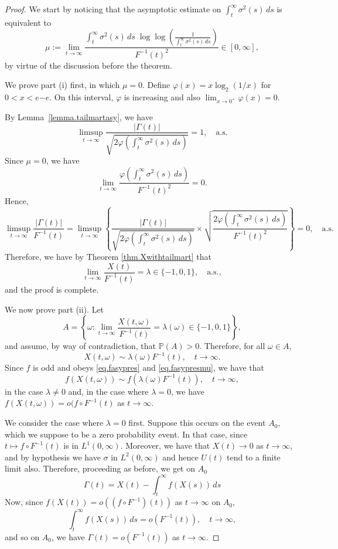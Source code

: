 \documentclass[10pt,a4paper]{amsart}
\begin{document}
	\begin{proof}
		We start by noticing that the asymptotic estimate on $\int_t^\infty \sigma^2(s)\,ds$ is equivalent to 
		\[
		\mu := \lim_{t \to \infty} \frac{\int_t^\infty \sigma^2(s)\, ds \; \log\log \left( \frac{1}{\int_t^\infty \sigma^2(s) \, ds} \right)}{F^{-1}(t)^2} \in [0,\infty], 
		\]
		by virtue of the discussion before the theorem. 
		
		We prove part (i) first, in which $\mu=0$. Define $\varphi(x)=x\log_2(1/x)$ for $0<x<e{-e}$. On this interval, $\varphi$ is increasing and also $\lim_{x\to 0^+} \varphi(x)=0$.
		
		By Lemma~\ref{lemma.tailmartasy}, we have 
		\[
		\limsup_{t \to \infty} \frac{|\Gamma(t)|}{\sqrt{2\varphi\!\left(\int_t^\infty \sigma^2(s)\, ds\right)}} = 1,\quad \text{a.s.}
		\]
		Since $\mu = 0$, we have
		\[
		\lim_{t \to \infty} \frac{\varphi\!\left(\int_t^\infty \sigma^2(s)\, ds\right)}{F^{-1}(t)^2} = 0.
		\]
		Hence,
		\[
		\limsup_{t \to \infty} \frac{|\Gamma(t)|}{F^{-1}(t)}
		= \limsup_{t \to \infty} 
		\left\{ \frac{|\Gamma(t)|}{\sqrt{2\varphi\!\left(\int_t^\infty \sigma^2(s)\, ds\right)}}
		\times
		\sqrt{\frac{2\varphi\!\left(\int_t^\infty \sigma^2(s)\, ds\right)}{F^{-1}(t)^2}}
		\right\}
		= 0, \quad \text{a.s.}
		\]
		Therefore, we have by Theorem \ref{thm.Xwithtailmart} that
		\[
		\lim_{t \to \infty} \frac{X(t)}{F^{-1}(t)} = \lambda \in \{-1,0,1\}, 
		\quad \text{a.s.},
		\]
		and the proof is complete.
		
		We now prove part (ii). Let
		\[
		A = \left\{ \omega : \lim_{t \to \infty} \frac{X(t,\omega)}{F^{-1}(t)} = \lambda(\omega) \in \{-1,0,1\} \right\},
		\]
		and assume, by way of contradiction, that $\mathbb{P}(A) > 0$. Therefore, for all $\omega \in A$,
		\[
		X(t,\omega) \sim \lambda(\omega) F^{-1}(t), \quad t \to \infty.
		\]
		Since $f$ is odd and obeys \eqref{eq.fasypres} and \eqref{eq.fasypresmu}, we have that 
		\[
		f(X(t,\omega)) \sim f(\lambda(\omega) F^{-1}(t)), \quad t \to \infty,
		\]
		in the case $\lambda\neq 0$ and, in the case where $\lambda=0$, we have $f(X(t,\omega))=o(f\circ F^{-1}(t)$ as $t\to\infty$.
		
		We consider the case where $\lambda=0$ first. Suppose this occurs on the event $A_0$, which we suppose to  be a zero probability event. In that case, since $t\mapsto f\circ F^{-1}(t)$ is in $L^1(0,\infty)$. Moreover, we have that $X(t)\to 0$ as $t\to\infty$, and by hypothesis we have $\sigma$ in $L^2(0,\infty)$ and hence $U(t)$ tend to a finite limit also. Therefore, proceeding as before, we get on $A_0$ 
		\[
		\Gamma(t) = X(t)-\int_t^\infty f(X(s))\,ds
		\] 
		Now, since $f(X(t))=o((f\circ F^{-1})(t))$ as $t\to\infty$ on $A_0$, 
		\[
		\int_t^\infty f(X(s))\,ds = o(F^{-1}(t)), \quad t\to\infty,
		\]
		and so on $A_0$, we have $\Gamma(t)=o(F^{-1}(t))$ as $t\to\infty$. 
		

\end{proof}
\end{document}
